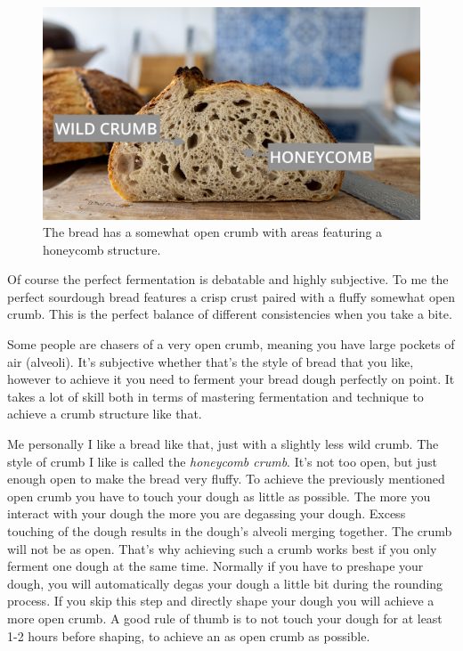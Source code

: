 \begin{figure}
  \includegraphics[width=\textwidth]{open-crumb}
  \caption{The bread has a somewhat open crumb with areas
  featuring a honeycomb structure.}
  \label{fig:open-crumb}
\end{figure}

Of course the perfect fermentation is debatable and highly subjective. To
me the perfect sourdough bread features a crisp crust paired with a fluffy
somewhat open crumb. This is the perfect balance of different consistencies
when you take a bite.

Some people are chasers of a very open crumb, meaning you have large pockets
of air (alveoli). It's subjective whether that's the style of bread that you like,
however to achieve it you need to ferment your bread dough perfectly on point.
It takes a lot of skill both in terms of mastering fermentation and technique
to achieve a crumb structure like that.

Me personally I like a bread like that, just with a slightly less wild crumb.
The style of crumb I like is called the {\it honeycomb crumb}. It's not too open, but
just enough open to make the bread very fluffy. To achieve the previously mentioned open crumb you
have to touch your dough as little as possible. The more you interact with your
dough the more you are degassing your dough. Excess touching of the dough
results in the dough's alveoli merging together. The crumb will not be as open.
That's why achieving such a crumb works best if you only ferment
one dough at the same time. Normally if you have to preshape your dough,
you will automatically degas your dough a little bit during the rounding process.
If you skip this step and directly shape your dough you will achieve a more open crumb.
A good rule of thumb is to not touch your dough for at least 1-2 hours before shaping,
to achieve an as open crumb as possible.

